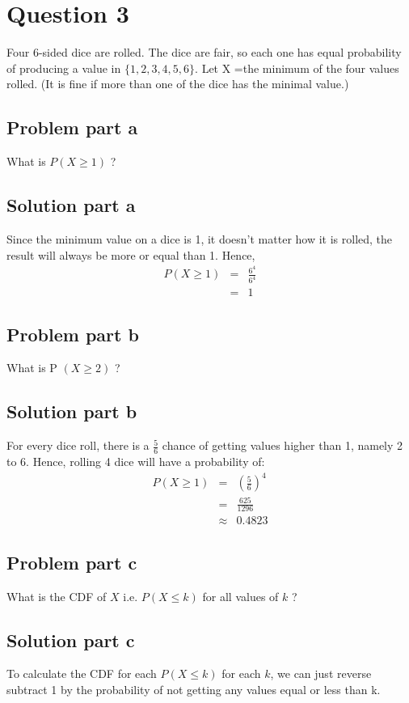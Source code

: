 \documentclass[12pt]{article}%
\begin{document}
\section*{Question 3}
Four 6-sided dice are rolled. The dice are fair, so each one has equal probability of producing a value in $\{1,2,3,4,5,6\}$. Let X =the minimum of the four values rolled. (It is fine if more than one of the dice has the minimal value.)
\subsection*{Problem part a}
What is $P(X \geq 1)$ ?
\subsection*{Solution part a}
Since the minimum value on a dice is 1, it doesn't matter how it is rolled, the result will always be more or equal than 1. Hence, 
\begin{eqnarray*}
P(X \geq 1) & = & \frac{6^4}{6^4} \\
			& = & 1
\end{eqnarray*}
\subsection*{Problem part b}
What is P $(X \geq 2)$ ?
\subsection*{Solution part b}
For every dice roll, there is a $\frac{5}{6}$ chance of getting values higher than 1, namely 2 to 6. Hence, rolling 4 dice will have a probability of: 
\begin{eqnarray*}
P(X \geq 1) & = & (\frac{5}{6})^4 \\
			& = & \frac{625}{1296} \\
			& \approx & 0.4823
\end{eqnarray*}
\subsection*{Problem part c}
What is the CDF of $X$ i.e. $P(X \leq k)$ for all values of $k$ ?
\subsection*{Solution part c}
To calculate the CDF for each $P(X \leq k)$ for each $k$, we can just reverse subtract 1 by the probability of not getting any values equal or less than k. \\
\end{document}
